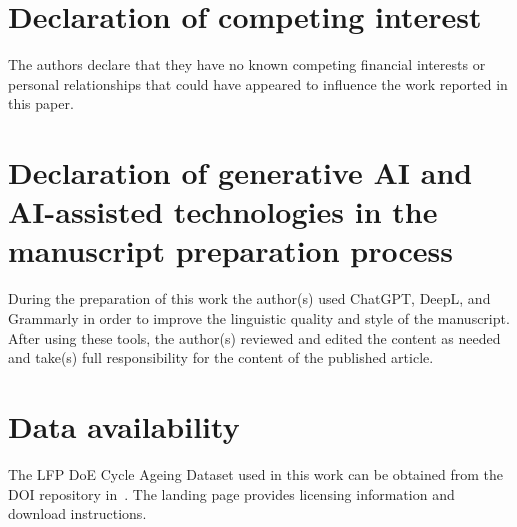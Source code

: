 \documentclass[review]{elsarticle}
\begin{document}
\section*{Declaration of competing interest}
The authors declare that they have no known competing financial interests or personal relationships that could have appeared to influence the work reported in this paper.
\section*{Declaration of generative AI and AI-assisted technologies in the manuscript preparation process}
During the preparation of this work the author(s) used ChatGPT, DeepL, and Grammarly in order to improve the linguistic quality and style of the manuscript. After using these tools, the author(s) reviewed and edited the content as needed and take(s) full responsibility for the content of the published article.

\section*{Data availability}
The LFP DoE Cycle Ageing Dataset used in this work can be obtained from the DOI repository in~\cite{LFP_DoE_Cycle_Aging_Dataset}. The landing page provides licensing information and download instructions.



\end{document}
